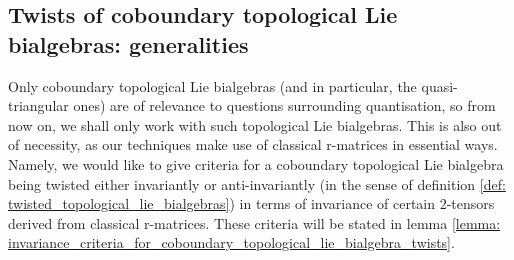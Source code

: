     \subsection{Twists of coboundary topological Lie bialgebras: generalities} \label{subsection: twisted_coboundary_topological_lie_bialgebras_generalities}
        Only coboundary topological Lie bialgebras (and in particular, the quasi-triangular ones) are of relevance to questions surrounding quantisation, so from now on, we shall only work with such topological Lie bialgebras. This is also out of necessity, as our techniques make use of classical r-matrices in essential ways. Namely, we would like to give criteria for a coboundary topological Lie bialgebra being twisted either invariantly or anti-invariantly (in the sense of definition \ref{def: twisted_topological_lie_bialgebras}) in terms of invariance of certain $2$-tensors derived from classical r-matrices. These criteria will be stated in lemma \ref{lemma: invariance_criteria_for_coboundary_topological_lie_bialgebra_twists}.

